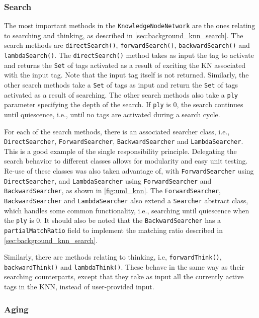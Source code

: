 \documentclass[titlepage,11pt]{article}
\newcommand{\code}[1]{\texttt{#1}}
\begin{document}
\subsubsection{Search}

The most important methods in the \code{KnowledgeNodeNetwork} are the ones relating to searching and thinking, as described in \cref{sec:background_knn_search}. The search methods are \code{directSearch()}, \code{forwardSearch()}, \code{backwardSearch()} and \code{lambdaSearch()}. The \code{directSearch()} method takes as input the tag to activate and returns the \code{Set} of tags activated as a result of exciting the KN associated with the input tag. Note that the input tag itself is not returned.
Similarly, the other search methods take a \code{Set} of tags as input and return the \code{Set} of tags activated as a result of searching. The other search methods also take a \code{ply} parameter specifying the depth of the search. If \code{ply} is 0, the search continues until quiescence, i.e., until no tags are activated during a search cycle.

For each of the search methods, there is an associated searcher class, i.e., \code{DirectSearcher}, \code{ForwardSearcher}, \code{BackwardSearcher} and \code{LambdaSearcher}. This is a good example of the single responsibility principle. Delegating the search behavior to different classes allows for modularity and easy unit testing. Re-use of these classes was also taken advantage of, with \code{ForwardSearcher} using \code{DirectSearcher}, and \code{LambdaSearcher} using \code{ForwardSearcher} and \code{BackwardSearcher}, as shown in \cref{fig:uml_knn}. The \code{ForwardSearcher}, \code{BackwardSearcher} and \code{LambdaSearcher} also extend a \code{Searcher} abstract class, which handles some common functionality, i.e., searching until quiescence when the \code{ply} is 0. It should also be noted that the \code{BackwardSearcher} has a \code{partialMatchRatio} field to implement the matching ratio described in \cref{sec:background_knn_search}.

Similarly, there are methods relating to thinking, i.e, \code{forwardThink()}, \code{backwardThink()} and \code{lambdaThink()}. These behave in the same way as their searching counterparts, except that they take as input all the currently active tags in the KNN, instead of user-provided input.

\subsubsection{Aging}
\end{document}
